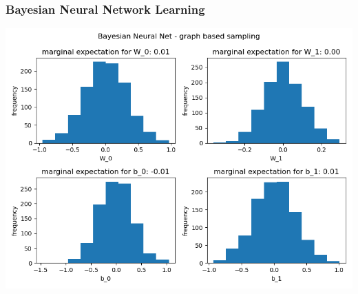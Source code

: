 \documentclass[10pt]{homeworg}
\begin{document}
\subsubsection{Bayesian Neural Network Learning}
\begin{center}
\includegraphics[scale=0.8]{figures/graph_4}
\end{center}
\end{document}
